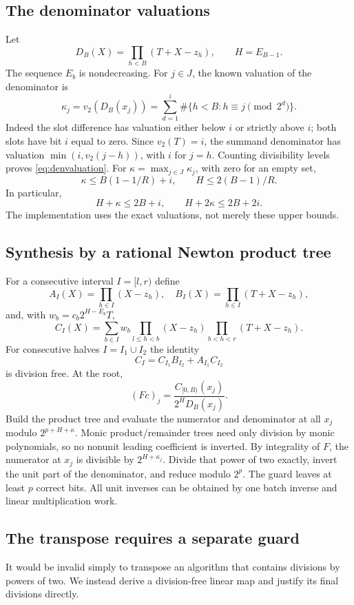 \subsection{The denominator valuations}
Let
\[
 D_B(X)=\prod_{h<B}(T+X-z_h),\qquad H=E_{B-1}.
\]
The sequence $E_b$ is nondecreasing. For $j\in J$, the known valuation of
the denominator is
\begin{equation}\label{eq:denvaluation}
 \kappa_j=v_2(D_B(x_j))
   =\sum_{d=1}^{i}\#\{h<B:h\equiv j\pmod{2^d}\}.
\end{equation}
Indeed the slot difference has valuation either below $i$ or strictly
above $i$; both slots have bit $i$ equal to zero. Since $v_2(T)=i$,
the summand denominator has valuation $\min(i,v_2(j-h))$, with $i$ for
$j=h$. Counting divisibility levels proves \eqref{eq:denvaluation}.
For $\kappa=\max_{j\in J}\kappa_j$, with zero for an empty set,
\[
 \kappa\le B(1-1/R)+i,\qquad H\le2(B-1)/R.
\]
In particular,
\begin{equation}\label{eq:guards}
 H+\kappa\le2B+i,\qquad H+2\kappa\le2B+2i.
\end{equation}
The implementation uses the exact valuations, not merely these upper bounds.

\subsection{Synthesis by a rational Newton product tree}
For a consecutive interval $I=[l,r)$ define
\[
 A_I(X)=\prod_{h\in I}(X-z_h),\quad
 B_I(X)=\prod_{h\in I}(T+X-z_h),
\]
and, with $w_b=c_b2^{H-E_b}T$,
\[
 C_I(X)=\sum_{b\in I}w_b
    \prod_{l\le h<b}(X-z_h)
    \prod_{b<h<r}(T+X-z_h).
\]
For consecutive halves $I=I_1\cup I_2$ the identity
\begin{equation}\label{eq:producttree}
 C_I=C_{I_1}B_{I_2}+A_{I_1}C_{I_2}
\end{equation}
is division free. At the root,
\[
 (Fc)_j=\frac{C_{[0,B)}(x_j)}{2^H D_B(x_j)}.
\]
Build the product tree and evaluate the numerator and denominator at all
$x_j$ modulo $2^{p+H+\kappa}$. Monic product/remainder trees need only
division by monic polynomials, so no nonunit leading coefficient is
inverted. By integrality of $F$, the numerator at $x_j$ is divisible
by $2^{H+\kappa_j}$. Divide that power of two exactly, invert the unit
part of the denominator, and reduce modulo $2^p$. The guard leaves at
least $p$ correct bits. All unit inverses can be obtained by one batch
inverse and linear multiplication work.

\subsection{The transpose requires a separate guard}
It would be invalid simply to transpose an algorithm that contains
divisions by powers of two. We instead derive a division-free linear
map and justify its final divisions directly.

